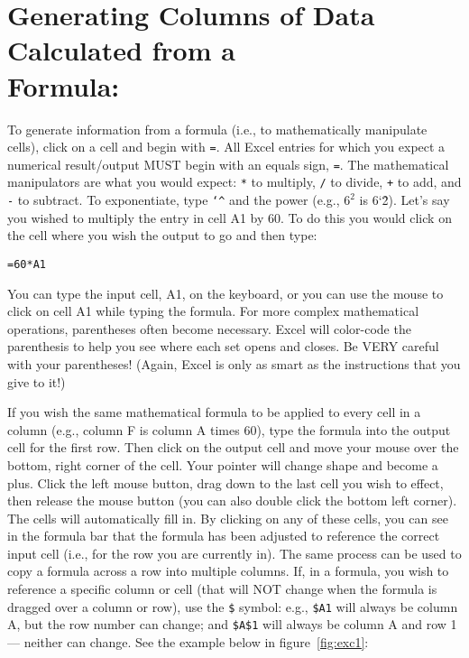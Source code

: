 \section*{Generating Columns of Data Calculated from a \\ Formula:}
To generate information from a formula (i.e., to mathematically manipulate cells), click on a cell and begin with \texttt{=}. 
All Excel entries for which you expect a numerical result/output MUST begin with an equals sign, \texttt{=}. 
The mathematical manipulators are what you would expect: \texttt{*} to multiply, \texttt{/} to divide, \texttt{+} to add, and \texttt{-} to subtract. 
To exponentiate, type \texttt{\char`\^} and the power (e.g., $6^{2}$ is 6\char`\^2). 
Let's say you wished to multiply the entry in cell A1 by 60. 
To do this you would click on the cell where you wish the output to go and then type:

\medskip
\texttt{=60*A1}
\medskip

You can type the input cell, A1, on the keyboard, or you can use the mouse to click on cell A1 while typing the formula. 
For more complex mathematical operations, parentheses often become necessary. 
Excel will color-code the parenthesis to help you see where each set opens and closes. 
Be VERY careful with your parentheses!
(Again, Excel is only as smart as the instructions that you give to it!)
\par 
If you wish the same mathematical formula to be applied to every cell in a column (e.g., column F is column A times 60), type the formula into the output cell for the first row. 
Then click on the output cell and move your mouse over the bottom, right corner of the cell. 
Your pointer will change shape and become a plus. 
Click the left mouse button, drag down to the last cell you wish to effect, then release the mouse button (you can also double click the bottom left corner). 
The cells will automatically fill in. 
By clicking on any of these cells, you can see in the formula bar that the formula has been adjusted to reference the correct input cell (i.e., for the row you are currently in). 
The same process can be used to copy a formula across a row into multiple columns. 
If, in a formula, you wish to reference a specific column or cell (that will NOT change when the formula is dragged over a column or row), use the \texttt{\$} symbol: e.g., \texttt{\$A1} will always be column A, but the row number can change; and \texttt{\$A\$1} will always be column A and row 1 — neither can change. See the example below in figure~\ref{fig:exc1}:

